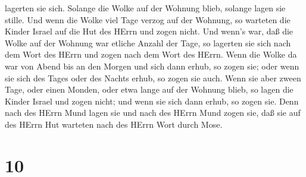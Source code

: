 lagerten sie sich. Solange die Wolke auf der Wohnung blieb, solange
lagen sie stille.  Und wenn die Wolke viel Tage verzog auf
der Wohnung, so warteten die Kinder Israel auf die Hut des HErrn und
zogen nicht.  Und wenn's war, daß die Wolke auf der Wohnung
war etliche Anzahl der Tage, so lagerten sie sich nach dem Wort des
HErrn und zogen nach dem Wort des HErrn.  Wenn die Wolke da
war von Abend bis an den Morgen und sich dann erhub, so zogen sie; oder
wenn sie sich des Tages oder des Nachts erhub, so zogen sie auch.
 Wenn sie aber zween Tage, oder einen Monden, oder etwa
lange auf der Wohnung blieb, so lagen die Kinder Israel und zogen nicht;
und wenn sie sich dann erhub, so zogen sie.  Denn nach des
HErrn Mund lagen sie und nach des HErrn Mund zogen sie, daß sie auf des
HErrn Hut warteten nach des HErrn Wort durch Mose.

\hypertarget{section-9}{%
\section{10}\label{section-9}}

